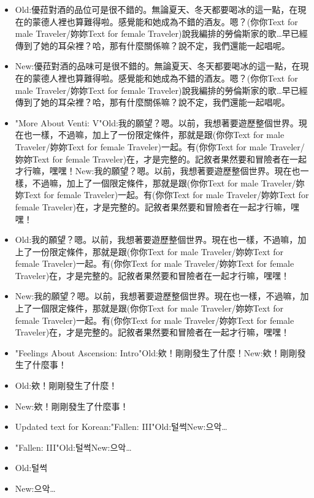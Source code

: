 \documentclass[a4paper,12pt]{article}
\begin{document}
\begin{itemize}
\item Old:優菈對酒的品位可是很不錯的。無論夏天、冬天都要喝冰的這一點，在現在的蒙德人裡也算難得啦。感覺能和她成為不錯的酒友。嗯？(‍你你Text for male Traveler/妳妳Text for female Traveler‍)說我編排的勞倫斯家的歌…早已經傳到了她的耳朵裡？哈，那有什麼關係嘛？說不定，我們還能一起唱呢。
\item New:優菈對酒的品味可是很不錯的。無論夏天、冬天都要喝冰的這一點，在現在的蒙德人裡也算難得啦。感覺能和她成為不錯的酒友。嗯？(‍你你Text for male Traveler/妳妳Text for female Traveler‍)說我編排的勞倫斯家的歌…早已經傳到了她的耳朵裡？哈，那有什麼關係嘛？說不定，我們還能一起唱呢。
\item "More About Venti: V"Old:我的願望？嗯。以前，我想著要遊歷整個世界。現在也一樣，不過嘛，加上了一份限定條件，那就是跟(‍你你Text for male Traveler/妳妳Text for female Traveler‍)一起。有(‍你你Text for male Traveler/妳妳Text for female Traveler‍)在，才是完整的。記敘者果然要和冒險者在一起才行嘛，嘿嘿！New:我的願望？嗯。以前，我想著要遊歷整個世界。現在也一樣，不過嘛，加上了一個限定條件，那就是跟(‍你你Text for male Traveler/妳妳Text for female Traveler‍)一起。有(‍你你Text for male Traveler/妳妳Text for female Traveler‍)在，才是完整的。記敘者果然要和冒險者在一起才行嘛，嘿嘿！
\item Old:我的願望？嗯。以前，我想著要遊歷整個世界。現在也一樣，不過嘛，加上了一份限定條件，那就是跟(‍你你Text for male Traveler/妳妳Text for female Traveler‍)一起。有(‍你你Text for male Traveler/妳妳Text for female Traveler‍)在，才是完整的。記敘者果然要和冒險者在一起才行嘛，嘿嘿！
\item New:我的願望？嗯。以前，我想著要遊歷整個世界。現在也一樣，不過嘛，加上了一個限定條件，那就是跟(‍你你Text for male Traveler/妳妳Text for female Traveler‍)一起。有(‍你你Text for male Traveler/妳妳Text for female Traveler‍)在，才是完整的。記敘者果然要和冒險者在一起才行嘛，嘿嘿！
\item "Feelings About Ascension: Intro"Old:欸！剛剛發生了什麼！New:欸！剛剛發生了什麼事！
\item Old:欸！剛剛發生了什麼！
\item New:欸！剛剛發生了什麼事！
\item Updated text for Korean:"Fallen: III"Old:털썩New:으악…
\item "Fallen: III"Old:털썩New:으악…
\item Old:털썩
\item New:으악…
\end{itemize}\\ \par \vspace{0.5cm}
\end{document}
